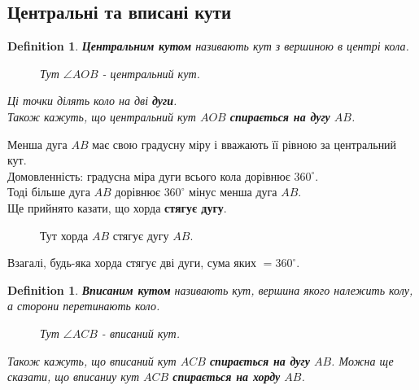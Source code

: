\documentclass[a4paper, 10pt]{article}
\theoremstyle{theoremdd}
\theoremstyle{theoremdd}
\theoremstyle{theoremdd}
\newtheorem{definition}[theorem]{Definition}
\theoremstyle{theoremdd}
\theoremstyle{theoremdd}
\theoremstyle{theoremdd}
\theoremstyle{theoremdd}
\theoremstyle{theoremdd}
\theoremstyle{theoremdd}
\begin{document}
\subsection{Центральні та вписані кути}
\begin{definition}
\textbf{Центральним кутом} називають кут з вершиною в центрі кола.
\begin{figure}[H]
\centering
{}
\caption*{Тут $\angle AOB$ - центральний кут.}
\end{figure}
Ці точки ділять коло на дві \textbf{дуги}.\\
Також кажуть, що центральний кут $AOB$ \textbf{спирається на дугу} $AB$.
\end{definition}
Менша дуга $AB$ має свою градусну міру і вважають її рівною за центральний кут.\\
Домовленність: градусна міра дуги всього кола дорівнює $360^\circ$.\\
Тоді більше дуга $AB$ дорівнює $360^\circ$ мінус менша дуга $AB$.
\bigskip \\
Ще прийнято казати, що хорда \textbf{стягує дугу}.
\begin{figure}[H]
\centering
{}
\caption*{Тут хорда $AB$ стягує дугу $AB$.}
\end{figure}
Взагалі, будь-яка хорда стягує дві дуги, сума яких $=360^\circ$.

\begin{definition}
\textbf{Вписаним кутом} називають кут, вершина якого належить колу, а сторони перетинають коло.
\begin{figure}[H]
\centering
{}
\caption*{Тут $\angle ACB$ - вписаний кут.}
\end{figure}
Також кажуть, що вписаний кут $ACB$ \textbf{спирається на дугу} $AB$. Можна ще сказати, що вписаниу кут $ACB$ \textbf{спирається на хорду} $AB$.
\end{definition}
\end{document}
